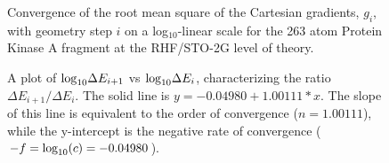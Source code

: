 \documentclass[prl,twocolumn,showpacs,twocolumngrid,superbib]{revtex4}
\begin{document}
{\begin{figure}[h]
\caption{
Convergence of the root mean square of the Cartesian gradients, $g_{i}$,
with geometry step $i$ on a log$_{10}$-linear  scale for the 
263 atom Protein Kinase A fragment at the RHF/STO-2G level of theory.}\label{gradientpicture} 
\end{figure}

\begin{figure}[h]
\caption{A plot of ${\rm log}_{10} \Delta E_{i+1}$ vs  ${\rm log}_{10} \Delta E_{i}$,  characterizing the ratio 
         $\Delta E_{i+1}/\Delta E_i$.  The solid line is $y=-0.04980+1.00111 *x$. 
         The slope  of this line is equivalent to the order of convergence ($n=1.00111$), 
         while the y-intercept is the negative rate of convergence ($-f ={\rm log}_{10}(c)= -0.04980$).}
\label{loglogplot}
\end{figure}

}
\end{document}
